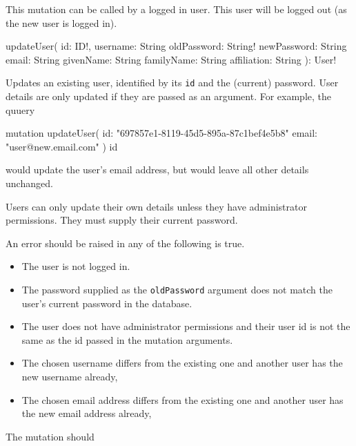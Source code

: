 \begin{note}
This mutation can be called by a logged in user. This user will be logged out (as the new user is logged in).
\end{note}


\begin{code}
updateUser(
  id: ID!,
  username: String
  oldPassword: String!
  newPassword: String
  email: String
  givenName: String
  familyName: String
  affiliation: String
): User!
\end{code}

Updates an existing user, identified by its \verb|id| and the (current) password. User details are only updated if they are passed as an argument. For example, the quuery

\begin{code}
mutation {
  updateUser(
    id: "697857e1-8119-45d5-895a-87c1bef4e5b8"
    email: "user@new.email.com"
  ) {
    id
  }
}
\end{code}

would update the user's email address, but would leave all other details unchanged.

\restrictions

Users can only update their own details unless they have administrator permissions. They must supply their current password.

\errors

An error should be raised in any of the following is true.

\begin{itemize}
    \item The user is not logged in.
    \item The password supplied as the \verb|oldPassword| argument does not match the user's current password in the database.
    \item The user does not have administrator permissions and their user id is not the same as the id passed in the mutation arguments.
    \item The chosen username differs from the existing one and another user has the new username already,
    \item The chosen email address differs from the existing one and another user has the new email address already,
\end{itemize}

\functionality

The mutation should


